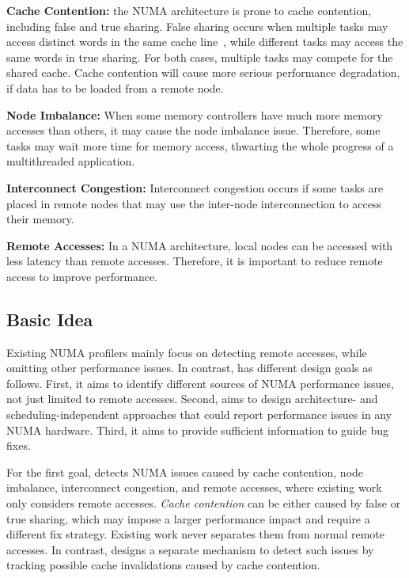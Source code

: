 \textbf{Cache Contention:} the NUMA architecture is prone to cache contention, including false and true sharing. False sharing occurs when multiple tasks may access distinct words in the same cache line~\cite{Hoard}, while different tasks may access the same words in true sharing. For both cases, multiple tasks may compete for the shared cache. Cache contention will cause more serious performance degradation, if data has to be loaded from a remote node. 
 
\textbf{Node Imbalance:} When some memory controllers have much more memory accesses than others, it may cause the node imbalance issue.
Therefore, some tasks may wait more time for memory access, thwarting the whole progress of a multithreaded application. 

\textbf{Interconnect Congestion:} Interconnect congestion occurs if some tasks are placed in remote nodes that may use the inter-node interconnection to access their memory. 

\textbf{Remote Accesses:} In a NUMA architecture, local nodes can be accessed with less latency than remote accesses. 
Therefore, it is important to reduce remote access to improve performance.



\subsection{Basic Idea}
\label{sec:idea}

 
Existing NUMA profilers mainly focus on detecting remote accesses, while omitting other performance issues. In contrast, \NP{} has different design goals as follows.  First, it aims to identify different sources of NUMA performance issues, not just limited to remote accesses. Second, \NP{} aims to design architecture- and scheduling-independent approaches that could report performance issues in any NUMA hardware. Third, it aims to provide sufficient information to guide bug fixes.  

For the first goal, \NP{} detects NUMA issues caused by cache contention, node imbalance, interconnect congestion, and remote accesses, where existing work only considers remote accesses.  \textit{Cache contention} can be either caused by false or true sharing, which may impose a larger performance impact and require a different fix strategy. Existing work never separates them from normal remote accesses. In contrast, \NP{} designs a separate mechanism to detect such issues by tracking possible cache invalidations caused by cache contention. 

